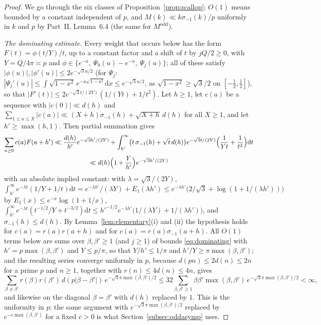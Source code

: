 \documentclass[11pt]{amsart}
\theoremstyle{remark}
\newcommand{\dd}{\mathrm{d}}
\begin{document}
\begin{proof}
We go through the six classes of Proposition~\ref{prop:scallop}; $O(1)$ means bounded by a constant independent of $p$, and $M(k)\ll k\sigma_{-1}(k)/p$ uniformly in $k$ and $p$ by Part~II, Lemma~6.4 (the same for $M^{\mathrm{odd}}$).

\emph{The dominating estimate.} Every weight that occurs below has the form $F(t)=\phi(t/Y)/t$, up to a constant factor and a shift of $t$ by $jQ/2\ge0$, with $Y=Q/4\pi\asymp p$ and $\phi\in\{e^{-u},\ \Psi_0(u)-e^{-u},\ \Psi_j(u)\}$; all of these satisfy $|\phi(u)|,|\phi'(u)|\le2e^{-\sqrt3u/2}$ (for $\Psi_j$: $|\Psi_j'(u)|\le\int\sqrt{1-x^2}\,e^{-u\sqrt{1-x^2}}\dd x\le e^{-\sqrt3u/2}$, as $\sqrt{1-x^2}\ge\sqrt3/2$ on $[-\frac12,\frac12]$), so that $|F'(t)|\le2e^{-\sqrt3t/(2Y)}(1/(Yt)+1/t^2)$. Let $h\ge1$, let $c(a)$ be a sequence with $|c(0)|\ll d(h)$ and $\sum_{1\le a\le X}|c(a)|\ll(X+h)\sigma_{-1}(h)+\sqrt{X+h}\,d(h)$ for all $X\ge1$, and let $h'\ge\max(h,1)$. Then partial summation gives
\begin{multline}\label{eq:dominating}
\sum_{a\ge0}c(a)F(a+h')\ll\frac{d(h)}{h'}e^{-\sqrt3h'/(2Y)}+\int_{h'}^\infty\bigl(t\,\sigma_{-1}(h)+\sqrt t\,d(h)\bigr)e^{-\sqrt3t/(2Y)}\Bigl(\frac1{Yt}+\frac1{t^2}\Bigr)\dd t\\
\ll d(h)\Bigl(1+\frac Y{h'}\Bigr)e^{-\sqrt3h'/(2Y)}
\end{multline}
with an absolute implied constant: with $\lambda=\sqrt3/(2Y)$, $\int_{h'}^\infty e^{-\lambda t}(1/Y+1/t)\dd t=e^{-\lambda h'}/(\lambda Y)+E_1(\lambda h')\le e^{-\lambda h'}\bigl(2/\sqrt3+\log(1+1/(\lambda h'))\bigr)$ by $E_1(x)\le e^{-x}\log(1+1/x)$, $\int_{h'}^\infty e^{-\lambda t}(t^{-1/2}/Y+t^{-3/2})\dd t\le h'^{-1/2}e^{-\lambda h'}\bigl(1/(\lambda Y)+1/(\lambda h')\bigr)$, and $\sigma_{-1}(h)\le d(h)$. By Lemma~\ref{lem:elementary}(i) and (ii) the hypothesis holds for $c(a)=r(a)r(a+h)$ and for $c(a)=r(a)\sigma_{-1}(a+h)$. All $O(1)$ terms below are sums over $\beta,\beta'\ge1$ (and $j\ge1$) of bounds \eqref{eq:dominating} with $h'=p\max(\beta,\beta')$ and $Y\le p/\pi$, so that $Y/h'\le1/\pi$ and $h'/Y\ge\pi\max(\beta,\beta')$; and the resulting series converge uniformly in $p$, because $d(pn)\le2d(n)\le2n$ for a prime $p$ and $n\ge1$, together with $r(n)\le4d(n)\le4n$, gives
\[
\sum_{\beta\ne\beta'}r(\beta)r(\beta')\,d(p|\beta-\beta'|)\,e^{-\sqrt3\pi\max(\beta,\beta')/2}\le32\sum_{\beta,\beta'\ge1}\beta\beta'\max(\beta,\beta')\,e^{-\sqrt3\pi\max(\beta,\beta')/2}<\infty,
\]
and likewise on the diagonal $\beta=\beta'$ with $d(h)$ replaced by $1$. This is the uniformity in $p$; the same argument with $e^{-\sqrt3\pi\max(\beta,\beta')/2}$ replaced by $e^{-c\max(\beta,\beta')}$ for a fixed $c>0$ is what Section~\ref{subsec:oddasymp} uses.


\end{proof}
\end{document}
